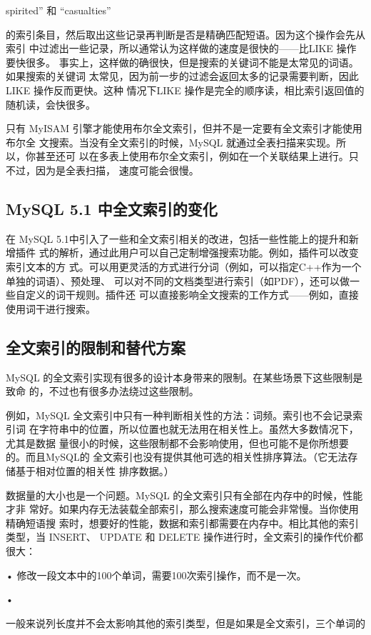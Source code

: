 spirited” 和 “casualties”

的索引条目，然后取出这些记录再判断是否是精确匹配短语。因为这个操作会先从索引
中过滤出一些记录，所以通常认为这样做的速度是很快的——比LIKE 操作要快很多。
事实上，这样做的确很快，但是搜索的关键词不能是太常见的词语。如果搜索的关键词
太常见，因为前一步的过滤会返回太多的记录需要判断，因此LIKE 操作反而更快。这种
情况下LIKE 操作是完全的顺序读，相比索引返回值的随机读，会快很多。

只有 MyISAM 引擎才能使用布尔全文索引，但并不是一定要有全文索引才能使用布尔全
文搜索。当没有全文索引的时候，MySQL 就通过全表扫描来实现。所以，你甚至还可
以在多表上使用布尔全文索引，例如在一个关联结果上进行。只不过，因为是全表扫描，
速度可能会很慢。

\subsection{MySQL 5.1 中全文索引的变化}
在 MySQL 5.1中引入了一些和全文索引相关的改进，包括一些性能上的提升和新增插件
式的解析，通过此用户可以自己定制增强搜索功能。例如，插件可以改变索引文本的方
式。可以用更灵活的方式进行分词（例如，可以指定C++作为一个单独的词语）、预处理、
可以对不同的文档类型进行索引（如PDF），还可以做一些自定义的词干规则。插件还
可以直接影响全文搜索的工作方式——例如，直接使用词干进行搜索。

\subsection{全文索引的限制和替代方案}
MySQL 的全文索引实现有很多的设计本身带来的限制。在某些场景下这些限制是致命
的，不过也有很多办法绕过这些限制。

例如，MySQL 全文索引中只有一种判断相关性的方法：词频。索引也不会记录索引词
在字符串中的位置，所以位置也就无法用在相关性上。虽然大多数情况下，尤其是数据
量很小的时候，这些限制都不会影响使用，但也可能不是你所想要的。而且MySQL的
全文索引也没有提供其他可选的相关性排序算法。（它无法存储基于相对位置的相关性
排序数据。）

数据量的大小也是一个问题。MySQL 的全文索引只有全部在内存中的时候，性能才非
常好。如果内存无法装载全部索引，那么搜索速度可能会非常慢。当你使用精确短语搜
索时，想要好的性能，数据和索引都需要在内存中。相比其他的索引类型，当 INSERT、
UPDATE 和 DELETE 操作进行时，全文索引的操作代价都很大：

• 修改一段文本中的100个单词，需要100次索引操作，而不是一次。

•

一般来说列长度并不会太影响其他的索引类型，但是如果是全文索引，三个单词的

